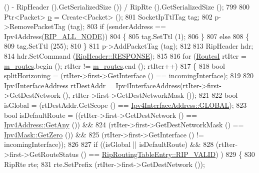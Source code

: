 \begin{DoxyCode}
      () - RipHeader ().GetSerializedSize ()) / RipRte ().GetSerializedSize ();
799 
800               Ptr<Packet> \hyperlink{lte__link__budget_8m_ac9de518908a968428863f829398a4e62}{p} = Create<Packet> ();
801               SocketIpTtlTag tag;
802               p->RemovePacketTag (tag);
803               \textcolor{keywordflow}{if} (senderAddress == Ipv4Address(\hyperlink{rip_8cc_a4088e07a51c9aabba6666b6c1e85f704}{RIP\_ALL\_NODE}))
804                 \{
805                   tag.SetTtl (1);
806                 \}
807               \textcolor{keywordflow}{else}
808                 \{
809                   tag.SetTtl (255);
810                 \}
811               p->AddPacketTag (tag);
812 
813               RipHeader hdr;
814               hdr.SetCommand (\hyperlink{classns3_1_1RipHeader_a8c6ce779ee35c8b65446aaa202a6e789a9f13028e2d4a57da73f592702d7b17c7}{RipHeader::RESPONSE});
815 
816               \textcolor{keywordflow}{for} (\hyperlink{classns3_1_1Rip_a8819af4dd44f270b6b19be755b39bce8}{RoutesI} rtIter = \hyperlink{classns3_1_1Rip_aea6c918ae311cd88fb2bfb714d6f9c30}{m\_routes}.begin (); rtIter != 
      \hyperlink{classns3_1_1Rip_aea6c918ae311cd88fb2bfb714d6f9c30}{m\_routes}.end (); rtIter++)
817                 \{
818                   \textcolor{keywordtype}{bool} splitHorizoning = (rtIter->first->GetInterface () == incomingInterface);
819 
820                   Ipv4InterfaceAddress rtDestAddr = Ipv4InterfaceAddress(rtIter->first->GetDestNetwork (), 
      rtIter->first->GetDestNetworkMask ());
821 
822                   \textcolor{keywordtype}{bool} isGlobal = (rtDestAddr.GetScope () == 
      \hyperlink{classns3_1_1Ipv4InterfaceAddress_a329cea433e74f717c26c9e51c4fcd3d8ae144856017bcfb529872c91204d462b2}{Ipv4InterfaceAddress::GLOBAL});
823                   \textcolor{keywordtype}{bool} isDefaultRoute = ((rtIter->first->GetDestNetwork () == 
      \hyperlink{classns3_1_1Ipv4Address_a7a39b330c8e701183a411d5779fca1a4}{Ipv4Address::GetAny} ()) &&
824                       (rtIter->first->GetDestNetworkMask () == \hyperlink{classns3_1_1Ipv4Mask_ac2dda492011ede8350008d753d278998}{Ipv4Mask::GetZero} ()) &&
825                       (rtIter->first->GetInterface () != incomingInterface));
826 
827                   \textcolor{keywordflow}{if} ((isGlobal || isDefaultRoute) &&
828                       (rtIter->first->GetRouteStatus () == 
      \hyperlink{classns3_1_1RipRoutingTableEntry_a4326145be5c3027f2ddf9eb80b6127a4ac29e62da26c18bf4b9caa5224cfee895}{RipRoutingTableEntry::RIP\_VALID}) )
829                     \{
830                       RipRte rte;
831                       rte.SetPrefix (rtIter->first->GetDestNetwork ());

\end{DoxyCode}
